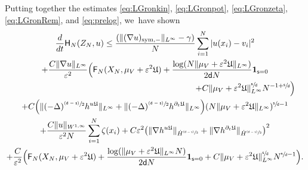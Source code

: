 \documentclass[JEP,XML,SOM,Unicode,published]{cedram}
\newcommand{\psfrac}[2]{\sfrac{(#1)}{#2}}
\newcommand{\sym}{\textup{sym}}
\theoremstyle{plain}
\theoremstyle{definition}
\DeclarePairedDelimiter{\pa}{\lparen}{\rparen}
\let\div\relax
\DeclareMathOperator{\div}{\mathrm{div}}
\let\ga\gamma
\let\vep\varepsilon
\let\p\partial
\let\ux X
\let\uz Z
\newcommand{\indic}{\mathbf{1}}
\newcommand{\Uu}{\mathfrak{U}}
\newcommand{\Fr}{\mathsf{F}}
\newcommand{\Hr}{\mathsf{H}}
\renewcommand{\d}{\mathsf{d}}
\newcommand{\s}{\mathsf{s}}
\begin{document}
Putting together the estimates \eqref{eq:LGronkin}, \eqref{eq:LGronpot}, \eqref{eq:LGronzeta}, \eqref{eq:LGronRem}, and \eqref{eq:prelog}, we~have shown
\begin{multline*}
\frac{d}{dt}\Hr_{N}(\uz_N,u) \leq \frac{(\|(\nabla u)_{\sym,-}\|_{L^\infty}-\ga)}{N}\sum_{i=1}^N |u(x_i)-v_i|^2 \\
+\frac{C\|\nabla u\|_{L^\infty}}{\vep^2}\Bigl(\Fr_N (\ux_N,\mu_V+\vep^2\Uu) + \frac{\log(N\|\mu_V+\vep^2\Uu\|_{L^\infty})}{2\d N}\indic_{\s=0}\\
\shoveright{+ C \|\mu_V+\vep^2\Uu\|_{L^\infty}^{\sfrac{\s}{\d}} N^{-1+\sfrac{\s}{\d}}\Bigr)}\\
+ C\pa*{\|(-\Delta)^{\psfrac{\d-\s}{2}}\div h^{u\Uu}\|_{L^\infty}+\|(-\Delta)^{\psfrac{\d-\s}{2}}h^{\p_t\Uu}\|_{L^\infty}}(N\|{\mu_V+\vep^2\Uu}\|_{L^\infty})^{\sfrac{\s}{\d}-1}\\
+ \frac{C\|u\|_{W^{1,\infty}}}{\vep^2N}\sum_{i=1}^N \zeta(x_i)+ C\vep^2\pa*{\|\nabla\div h^{u\Uu}\|_{\dot{H}^{\psfrac{\d-\s}{2}}}+ \|\nabla h^{\p_t\Uu}\|_{\dot{H}^{\psfrac{\d-\s}{2}}}}^2 \\
+ \frac{C}{\vep^2}\Big(\Fr_N(\ux_N,\mu_V+\vep^2\Uu) + \frac{\log(\|\mu_V+\vep^2\Uu\|_{L^\infty}N)}{2\d N}\indic_{\s=0} + C\|\mu_V+\vep^2\Uu\|_{L^\infty}^{\sfrac{\s}{\d}}N^{\sfrac{\s}{\d}-1}\Big).
\end{multline*}
\end{document}
